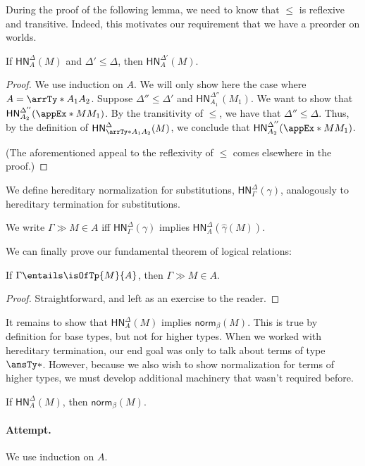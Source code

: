 \documentclass[letterpaper]{article}
\newcommand{\De}[0]{\Delta}
\newcommand{\Ga}[0]{\Gamma}
\newcommand{\ga}[0]{\gamma}
\newcommand{\betaNorm}[1]{\mathsf{norm}_\beta(#1)}
\newcommand{\HN}[3]{\mathsf{HN}^{#1}_{#2}(#3)}
\begin{document}
During the proof of the following lemma, we need to know that $\leq$ is
reflexive and transitive. Indeed, this motivates our requirement that we have a
preorder on worlds.

\begin{lemma}
If $\HN{\De}{A}{M}$ and $\De' \leq \De$, then $\HN{\De'}{A}{M}$.
\end{lemma}
\begin{proof}
We use induction on $A$. We will only show here the case where $A =
\arrTy*{A_1}{A_2}$. Suppose $\De'' \leq \De'$ and $\HN{\De''}{A_1}{M_1}$. We
want to show that $\HN{\De''}{A_2}{\appEx*{M}{M_1}}$. By the transitivity of
$\leq$, we have that $\De'' \leq \De$. Thus, by the definition of
$\HN{\De}{\arrTy*{A_1}{A_2}}{M}$, we conclude that
$\HN{\De''}{A_2}{\appEx*{M}{M_1}}$.

(The aforementioned appeal to the reflexivity of $\leq$ comes elsewhere in the
proof.)
\end{proof}

We define hereditary normalization for substitutions, $\HN{\De}{\Ga}{\ga}$,
analogously to hereditary termination for substitutions.

\begin{definition}
We write $\Ga \gg M \in A$ iff $\HN{\De}{\Ga}{\ga}$ implies
$\HN{\De}{A}{\widehat{\ga}(M)}$.
\end{definition}

We can finally prove our fundamental theorem of logical relations:
\begin{theorem}[FTLR]\label{thm:ftlr}
If $\Ga \entails \isOfTp{M}{A}$, then $\Ga \gg M \in A$.
\end{theorem}
\begin{proof}
Straightforward, and left as an exercise to the reader.
\end{proof}

It remains to show that $\HN{\De}{A}{M}$ implies $\betaNorm{M}$. This is true by definition
for base types, but not for higher types. When we worked with hereditary
termination, our end goal was only to talk about terms of type $\ansTy*$.
However, because we also wish to show normalization for terms of higher types,
we must develop additional machinery that wasn't required before.

\begin{lemma}
If $\HN{\De}{A}{M}$, then $\betaNorm{M}$.
\end{lemma}
\paragraph{Attempt.} We use induction on $A$.
\end{document}
